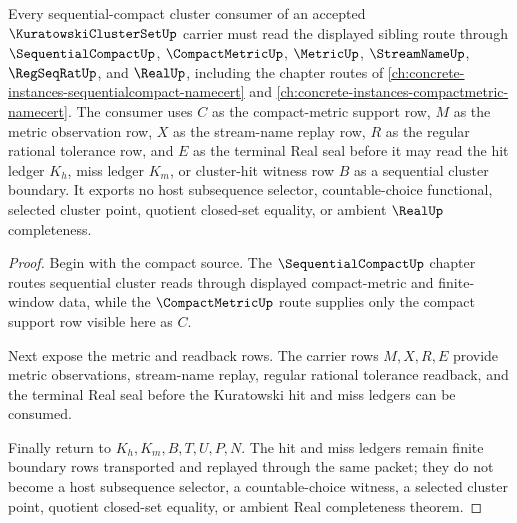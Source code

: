 \begin{theorem}
\label{thm:kuratowski-cluster-set-sequentialcompact-route}
Every sequential-compact cluster consumer of an accepted $\KuratowskiClusterSetUp$ carrier must read the displayed sibling route through $\SequentialCompactUp$, $\CompactMetricUp$, $\MetricUp$, $\StreamNameUp$, $\RegSeqRatUp$, and $\RealUp$, including the chapter routes of \autoref{ch:concrete-instances-sequentialcompact-namecert} and \autoref{ch:concrete-instances-compactmetric-namecert}. The consumer uses $C$ as the compact-metric support row, $M$ as the metric observation row, $X$ as the stream-name replay row, $R$ as the regular rational tolerance row, and $E$ as the terminal Real seal before it may read the hit ledger $K_h$, miss ledger $K_m$, or cluster-hit witness row $B$ as a sequential cluster boundary. It exports no host subsequence selector, countable-choice functional, selected cluster point, quotient closed-set equality, or ambient $\RealUp$ completeness.
\end{theorem}
\begin{proof}
Begin with the compact source. The $\SequentialCompactUp$ chapter routes sequential cluster reads through displayed compact-metric and finite-window data, while the $\CompactMetricUp$ route supplies only the compact support row visible here as $C$.

Next expose the metric and readback rows. The carrier rows $M,X,R,E$ provide metric observations, stream-name replay, regular rational tolerance readback, and the terminal Real seal before the Kuratowski hit and miss ledgers can be consumed.

Finally return to $K_h,K_m,B,T,U,P,N$. The hit and miss ledgers remain finite boundary rows transported and replayed through the same packet; they do not become a host subsequence selector, a countable-choice witness, a selected cluster point, quotient closed-set equality, or ambient Real completeness theorem.
\end{proof}


